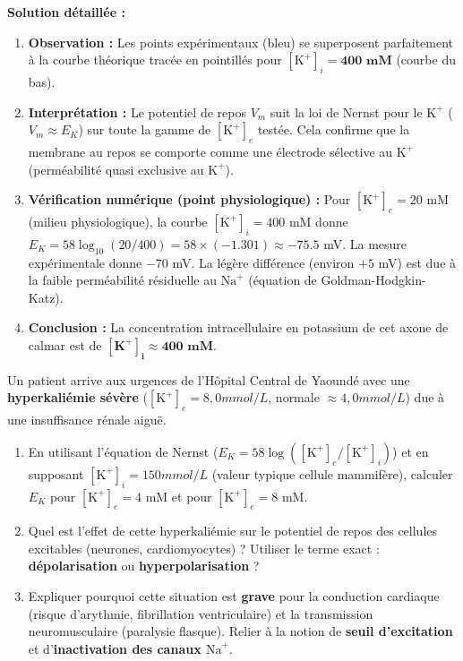 \documentclass[11pt]{article}
\begin{document}
\begin{exoresolu}
\tcblower
\textbf{Solution détaillée :}
\begin{enumerate}
    \item \textbf{Observation :} Les points expérimentaux (bleu) se superposent parfaitement à la courbe théorique tracée en pointillés pour $[\text{K}^+]_i = \mathbf{400 \text{ mM}}$ (courbe du bas).
    \item \textbf{Interprétation :} Le potentiel de repos $V_m$ suit la loi de Nernst pour le $\text{K}^+$ ($V_m \approx E_K$) sur toute la gamme de $[\text{K}^+]_e$ testée. Cela confirme que la membrane au repos se comporte comme une électrode sélective au $\text{K}^+$ (perméabilité quasi exclusive au $\text{K}^+$).
    \item \textbf{Vérification numérique (point physiologique) :} Pour $[\text{K}^+]_e = 20$ mM (milieu physiologique), la courbe $[\text{K}^+]_i = 400$ mM donne $E_K = 58 \log_{10}(20/400) = 58 \times (-1.301) \approx -75.5$ mV. La mesure expérimentale donne $-70$ mV. La légère différence (environ $+5$ mV) est due à la faible perméabilité résiduelle au $\text{Na}^+$ (équation de Goldman-Hodgkin-Katz).
    \item \textbf{Conclusion :} La concentration intracellulaire en potassium de cet axone de calmar est de \textbf{$\mathbf{[\text{K}^+]_i \approx 400 \text{ mM}}$}.
\end{enumerate}
\end{exoresolu}

\begin{exercice}
Un patient arrive aux urgences de l'Hôpital Central de Yaoundé avec une \textbf{hyperkaliémie sévère} ($[\text{K}^+]_e = 8,0 mmol/L$, normale $\approx 4,0 mmol/L$) due à une insuffisance rénale aiguë.
\begin{enumerate}
    \item En utilisant l'équation de Nernst ($E_K = 58 \log([\text{K}^+]_e/[\text{K}^+]_i)$) et en supposant $[\text{K}^+]_i = 150 mmol/L$ (valeur typique cellule mammifère), calculer $E_K$ pour $[\text{K}^+]_e = 4$ mM et pour $[\text{K}^+]_e = 8$ mM.
    \item Quel est l'effet de cette hyperkaliémie sur le potentiel de repos des cellules excitables (neurones, cardiomyocytes) ? Utiliser le terme exact : \textbf{dépolarisation} ou \textbf{hyperpolarisation} ?
    \item Expliquer pourquoi cette situation est \textbf{grave} pour la conduction cardiaque (risque d'arythmie, fibrillation ventriculaire) et la transmission neuromusculaire (paralysie flasque). Relier à la notion de \textbf{seuil d'excitation} et d'\textbf{inactivation des canaux $\text{Na}^+$}.
\end{enumerate}
\end{exercice}
\end{document}

